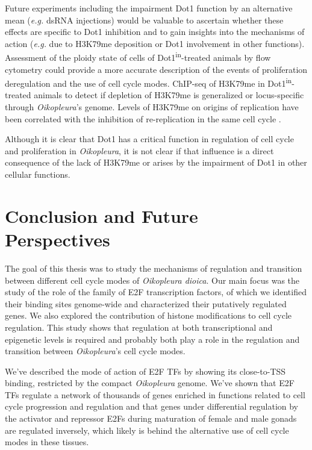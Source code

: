 \documentclass[11pt,twoside,a4paper]{report}
\begin{document}
Future experiments including the impairment Dot1 function by an alternative mean (\textit{e.g.} dsRNA injections) would be valuable to ascertain whether these effects are specific to Dot1 inhibition and to gain insights into the mechanisms of action (\textit{e.g.} due to H3K79me deposition or Dot1 involvement in other functions). Assessment of the ploidy state of cells of Dot1\textsuperscript{in}-treated animals by flow cytometry could provide a more accurate description of the events of proliferation deregulation and the use of cell cycle modes. ChIP-seq of H3K79me in Dot1\textsuperscript{in}-treated animals to detect if depletion of H3K79me is generalized or locus-specific through \textit{Oikopleura}'s genome. Levels of H3K79me on origins of replication have been correlated with the inhibition of re-replication in the same cell cycle \cite{Fu2013a}.

Although it is clear that Dot1 has a critical function in regulation of cell cycle and proliferation in \textit{Oikopleura}, it is not clear if that influence is a direct consequence of the lack of H3K79me or arises by the impairment of Dot1 in other cellular functions. 

\cleardoublepage

\chapter{Conclusion and Future Perspectives}
The goal of this thesis was to study the mechanisms of regulation and transition between different cell cycle modes of \textit{Oikopleura dioica}. Our main focus was the study of the role of the family of E2F transcription factors, of which we identified their binding sites genome-wide and characterized their putatively regulated genes. We also explored the contribution of histone modifications to cell cycle regulation. This study shows that regulation at both transcriptional and epigenetic levels is required and probably both play a role in the regulation and transition between \textit{Oikopleura}'s cell cycle modes.

We've described the mode of action of E2F TFs by showing its close-to-TSS binding, restricted by the compact \textit{Oikopleura} genome. We've shown that E2F TFs regulate a network of thousands of genes enriched in functions related to cell cycle progression and regulation and that genes under differential regulation by the activator and repressor E2Fs during maturation of female and male gonads are regulated inversely, which likely is behind the alternative use of cell cycle modes in these tissues.
\end{document}
